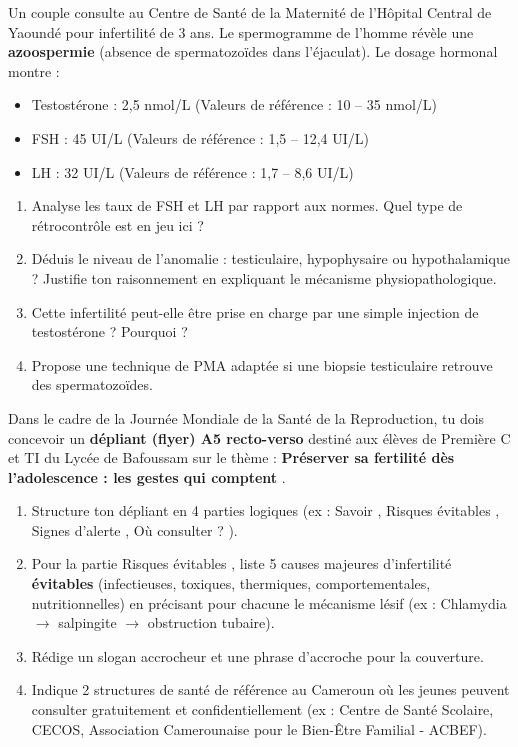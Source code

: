 \documentclass[11pt]{article}
\begin{document}
\begin{exercice}
Un couple consulte au Centre de Santé de la Maternité de l'Hôpital Central de Yaoundé pour infertilité de 3 ans. Le spermogramme de l'homme révèle une \textbf{azoospermie} (absence de spermatozoïdes dans l'éjaculat). Le dosage hormonal montre :
\begin{itemize}
    \item Testostérone : 2,5 nmol/L (Valeurs de référence : 10 -- 35 nmol/L)
    \item FSH : 45 UI/L (Valeurs de référence : 1,5 -- 12,4 UI/L)
    \item LH : 32 UI/L (Valeurs de référence : 1,7 -- 8,6 UI/L)
\end{itemize}
\begin{enumerate}
    \item Analyse les taux de FSH et LH par rapport aux normes. Quel type de rétrocontrôle est en jeu ici ?
    \item Déduis le niveau de l'anomalie : testiculaire, hypophysaire ou hypothalamique ? Justifie ton raisonnement en expliquant le mécanisme physiopathologique.
    \item Cette infertilité peut-elle être prise en charge par une simple injection de testostérone ? Pourquoi ?
    \item Propose une technique de PMA adaptée si une biopsie testiculaire retrouve des spermatozoïdes.
\end{enumerate}
\end{exercice}

\begin{exercice}
Dans le cadre de la Journée Mondiale de la Santé de la Reproduction, tu dois concevoir un \textbf{dépliant (flyer) A5 recto-verso} destiné aux élèves de Première C et TI du Lycée de Bafoussam sur le thème : \og \textbf{Préserver sa fertilité dès l'adolescence : les gestes qui comptent} \fg.
\begin{enumerate}
    \item Structure ton dépliant en 4 parties logiques (ex : \og Savoir \fg, \og Risques évitables \fg, \og Signes d'alerte \fg, \og Où consulter ? \fg).
    \item Pour la partie \og Risques évitables \fg, liste 5 causes majeures d'infertilité \textbf{évitables} (infectieuses, toxiques, thermiques, comportementales, nutritionnelles) en précisant pour chacune le mécanisme lésif (ex : Chlamydia $\rightarrow$ salpingite $\rightarrow$ obstruction tubaire).
    \item Rédige un slogan accrocheur et une phrase d'accroche pour la couverture.
    \item Indique 2 structures de santé de référence au Cameroun où les jeunes peuvent consulter gratuitement et confidentiellement (ex : Centre de Santé Scolaire, CECOS, Association Camerounaise pour le Bien-Être Familial - ACBEF).
\end{enumerate}
\end{exercice}
\end{document}
